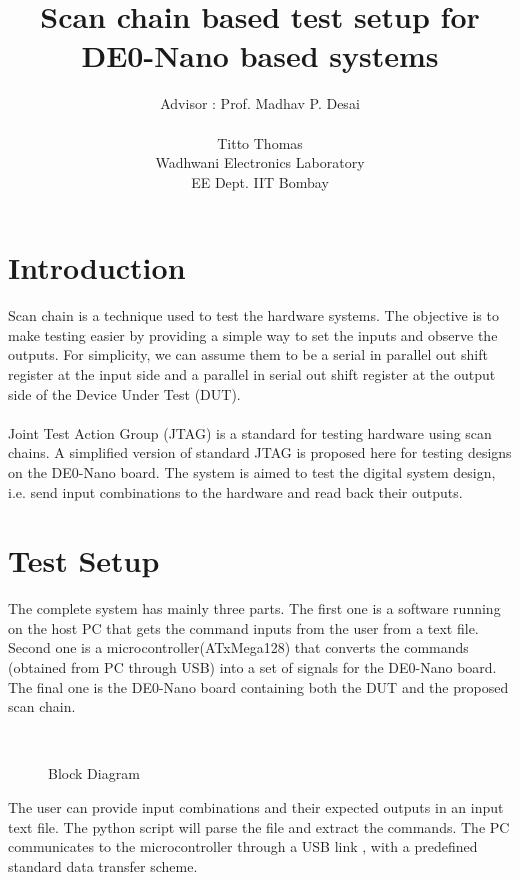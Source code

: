 \documentclass[a4paper,11pt]{article}
\title{\textbf{Scan chain based test setup for\\ DE0-Nano based systems}}
\author{Advisor : Prof. Madhav P. Desai \\ \\Titto Thomas \\ Wadhwani Electronics Laboratory \\ EE Dept. IIT Bombay}
\begin{document}
\maketitle

\section{Introduction}
Scan chain is a technique used to test the hardware systems. The objective is to make testing easier by providing a simple way to set the inputs and observe the outputs. For simplicity, we can assume them to be a serial in parallel out shift register at the input side and a parallel in serial out shift register at the output side of the Device Under Test (DUT).
\paragraph*{}

Joint Test Action Group (JTAG) is a standard  for testing hardware using scan chains. A simplified version of standard JTAG is proposed here for testing designs on the DE0-Nano board. The system is aimed to test the digital system design, i.e. send input combinations to the hardware and read back their outputs. 


\section{Test Setup}
The complete system has mainly three parts. The first one is a software running on the host PC that gets the command inputs from the user from a text file. Second one is a microcontroller(ATxMega128) that converts the commands (obtained from PC through USB) into a set of signals for the DE0-Nano board. The final one is the DE0-Nano board containing both the DUT and the proposed scan chain.

\begin{figure}[h!]
\centering
\\
\caption{Block Diagram}
\end{figure}

The user can provide input combinations and their expected outputs in an input text file. The python script will parse the file and extract the commands. The PC communicates to the microcontroller through a USB link , with a predefined standard data transfer scheme. 
\paragraph*{}
\end{document}
